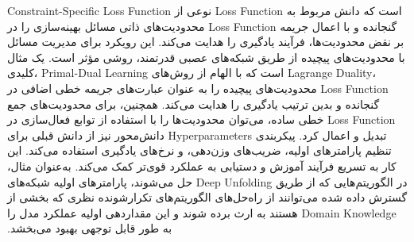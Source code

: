 \gls{Constraint-Specific Loss Function}
نوعی از 
\gls{Loss Function}
است که دانش مربوط به محدودیت‌های ذاتی مسائل بهینه‌سازی را در 
\gls{Loss Function}
 گنجانده و با اعمال جریمه بر نقض محدودیت‌ها، فرآیند یادگیری را هدایت می‌کند. این رویکرد برای مدیریت مسائل با محدودیت‌های پیچیده از طریق شبکه‌های عصبی قدرتمند، روشی مؤثر است. یک مثال کلیدی، 
\gls{Primal-Dual Learning}
  است که با الهام از روش‌های 
\gls{Lagrange Duality}،
   محدودیت‌های پیچیده را به عنوان عبارت‌های جریمه خطی اضافی در 
\gls{Loss Function}
    گنجانده و بدین ترتیب یادگیری را هدایت می‌کند. همچنین، برای محدودیت‌های جمع خطی ساده، می‌توان محدودیت‌ها را با استفاده از توابع فعال‌سازی در 
\gls{Loss Function}
     تبدیل و اعمال کرد.‬
‫پیکربندی 
\glspl{Hyperparameter}
 دانش‌محور نیز از دانش قبلی برای تنظیم پارامترهای اولیه، ضریب‌های وزن‌دهی، و نرخ‌های یادگیری استفاده می‌کند. این کار به تسریع فرآیند آموزش و دستیابی به عملکرد قوی‌تر کمک می‌کند. به‌عنوان مثال، در الگوریتم‌هایی که از طریق 
\gls{Deep Unfolding}
  حل می‌شوند، پارامترهای اولیه شبکه‌های گسترش داده شده می‌توانند از راه‌حل‌های الگوریتم‌های تکرارشونده نظری که بخشی از 
\gls{Domain Knowledge}
  هستند به ارث برده شوند و این مقداردهی اولیه عملکرد مدل را به طور قابل توجهی بهبود می‌بخشد.‬

